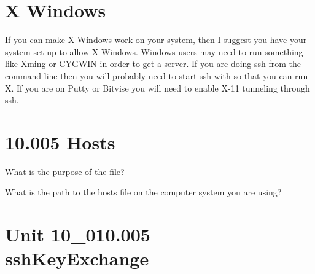 \documentclass[letterpaper,12pt]{exam}
\newcommand{\unit}{Unit 10}
\begin{document}
\section*{X Windows} %
If you can make X-Windows work on your system, then I suggest you have your system set up to allow X-Windows.  Windows users may need to run something like Xming or CYGWIN in order to get a server.
If you are doing ssh from the command line then you will probably need to start ssh with  so that you can run X. If you are on Putty or Bitvise you will need to enable X-11 tunneling through ssh.

\begin {questions}

\section*{10.005 Hosts} %

\begin{samepage}
\question What is the purpose of the  file?
\vspace{5mm}
\end{samepage}

\begin{samepage}
\question What is the path to the hosts file on the computer system you are using? 
\vspace{5mm}
\end{samepage}

\section*{\unit\_010.005 -- sshKeyExchange}

\end{questions}
\end{document}

